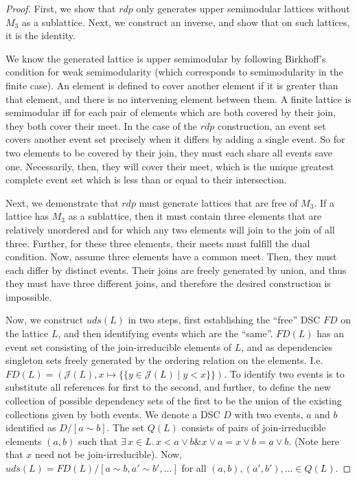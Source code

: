 \documentclass[hoptionsi,review,screen,format=acmsmall]{acmart}
\theoremstyle{definition}
\newcommand{\Jc}{\mathcal{J}}
\newcommand{\band}{\mathop{\&}}
\begin{document}
\begin{proof}
First, we show that \(rdp\) only generates upper semimodular lattices without \(M_3\) as a sublattice. Next, we construct an inverse, and show that on such lattices, it is the identity.

We know the generated lattice is upper semimodular by following Birkhoff's condition for weak semimodularity (which corresponds to semimodularity in the finite case). An element is defined to cover another element if it is greater than that element, and there is no intervening element between them. A finite lattice is semimodular iff for each pair of elements which are both covered by their join, they both cover their meet. In the case of the \(rdp\) construction, an event set covers another event set precisely when it differs by adding a single event. So for two elements to be covered by their join, they must each share all events save one. Necessarily, then, they will cover their meet, which is the unique greatest complete event set which is less than or equal to their intersection.

Next, we demonstrate that \(rdp\) must generate lattices that are free of \(M_3\). If a lattice has \(M_3\) as a sublattice, then it must contain three elements that are relatively unordered and for which any two elements will join to the join of all three. Further, for these three elements, their meets must fulfill the dual condition. Now, assume three elements have a common meet. Then, they must each differ by distinct events.  Their joins are freely generated by union, and thus they must have three different joins, and therefore the desired construction is impossible.

Now, we construct \(uds(L)\) in two steps, first establishing the ``free'' DSC \(FD\) on the lattice \(L\), and then identifying events which are the ``same''. \(FD(L)\) has an event set consisting of the join-irreducible elements of \(L\), and as dependencies singleton sets freely generated by the ordering relation on the elements.  I.e. \(FD(L) = (\Jc(L), x \mapsto \{\{ y \in \Jc(L) \mid y<x\}\})\). To identify two events is to substitute all references for first to the second, and further, to define the new collection of possible dependency sets of the first to be the union of the existing collections given by both events. We denote a DSC \(D\) with two events, \(a\) and \(b\) identified as  \(D/[a\sim b]\). The set \(Q(L)\) consists of pairs of join-irreducible elements \((a,b)\) such that  \(\exists\, x \in L . \,  x < a \vee b \band x \vee a = x \vee b = a \vee b\). (Note here that \(x\) need not be join-irreducible). Now, \(uds(L) = FD(L)/[a \sim b,a' \sim b',...]\) for all \((a,b), (a',b'), ...\in Q(L)\).


\end{proof}
\end{document}
